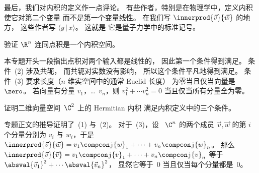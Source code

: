 最后，我们对内积的定义作一点评论。
有些作者，特别是在物理学中，定义内积使它对第二个变量
而不是第一个变量线性。
在我们写 $\innerprod{\vec{v}}{\vec{w}}$ 的地方，
这些作者写 $\langle y\, |\, x\rangle$。
这就是
它是量子力学中的标准记号。

\begin{exercises}
\item 
验证 $\R^n$ 连同点积是一个内积空间。
\begin{answer}
本专题开头一段指出点积对两个输入都是线性的，
因此第一个条件得到满足。
条件~(2) 涉及共轭，
而共轭对实数没有影响，
所以这个条件平凡地得到满足。
条件~(3) 要求长度（$n$ 维实空间中的通常 Euclid 长度）
为零当且仅当向量是~$\zero$。
若向量有分量 $v_1$，\ldots~$v_n$，则
$v_1^2+\cdots v_n^2=0$ 当且仅当所有分量全为零。
\end{answer}

\item
证明二维向量空间~$\C^2$ 上的 Hermitian 内积
满足内积定义中的三个条件。
\begin{answer}
专题正文的推导证明了~(1) 与~(2)。
对于~(3)，设
~$\C^n$ 的两个成员 $\vec{v},\vec{w}$
的第 $i$ 个分量分别为 $v_i$ 与 $w_i$，于是
$\innerprod{\vec{v}}{\vec{w}}=v_1\compconj{w}_1+\cdots+v_n\compconj{w}_n$。
那么 $\innerprod{\vec{v}}{\vec{v}}=v_1\compconj{v}_1+\cdots+v_n\compconj{v}_n$
等于 $\absval{\vec{v}_1}^2+\cdots \absval{\vec{v}_n}^2$，
显然它等于~$0$ 当且仅当每个分量都是~$0$。
\end{answer}


\end{exercises}
